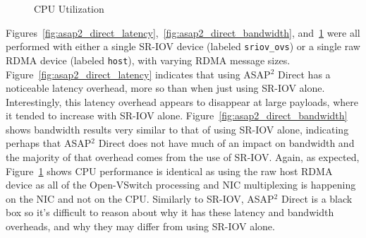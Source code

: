 \documentclass[12pt,titlepage]{article}
\begin{document}
\begin{figure}
	\centering
	\caption{CPU Utilization}%
	\label{fig:asap2_direct_cpu}
\end{figure}

Figures~\ref{fig:asap2_direct_latency},~\ref{fig:asap2_direct_bandwidth}, and~\ref{fig:asap2_direct_cpu} were all performed with either a single SR-IOV device (labeled \texttt{sriov\_ovs}) or a single raw RDMA device (labeled \texttt{host}), with varying RDMA message sizes.
Figure~\ref{fig:asap2_direct_latency} indicates that using ASAP$^2$ Direct has a noticeable latency overhead, more so than when just using SR-IOV alone. 
Interestingly, this latency overhead appears to disappear at large payloads, where it tended to increase with SR-IOV alone.
Figure~\ref{fig:asap2_direct_bandwidth} shows bandwidth results very similar to that of using SR-IOV alone, indicating perhaps that ASAP$^2$ Direct does not have much of an impact on bandwidth and the majority of that overhead comes from the use of SR-IOV\@.
Again, as expected, Figure~\ref{fig:asap2_direct_cpu} shows CPU performance is identical as using the raw host RDMA device as all of the Open-VSwitch processing and NIC multiplexing is happening on the NIC and not on the CPU\@.
Similarly to SR-IOV, ASAP$^2$ Direct is a black box so it's difficult to reason about why it has these latency and bandwidth overheads, and why they may differ from using SR-IOV alone.
\end{document}
